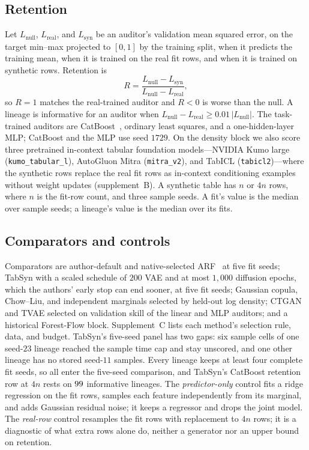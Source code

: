 \documentclass{article} %
\begin{document}
\subsection{Retention}
\label{sec:retention}
Let $L_{\mathrm{null}}$, $L_{\mathrm{real}}$, and $L_{\mathrm{syn}}$ be an auditor's validation mean squared error, on the target min--max projected to $[0,1]$ by the training split, when it predicts the training mean, when it is trained on the real fit rows, and when it is trained on synthetic rows. Retention is
\begin{equation}
\label{eq:retention}
R = \frac{L_{\mathrm{null}}-L_{\mathrm{syn}}}{L_{\mathrm{null}}-L_{\mathrm{real}}} ,
\end{equation}
so $R=1$ matches the real-trained auditor and $R<0$ is worse than the null. A lineage is informative for an auditor when $L_{\mathrm{null}}-L_{\mathrm{real}}\geq 0.01\,|L_{\mathrm{null}}|$. The task-trained auditors are CatBoost~\citep{prokhorenkova2018catboost}, ordinary least squares, and a one-hidden-layer MLP; CatBoost and the MLP use seed $1729$. On the density block we also score three pretrained in-context tabular foundation models---NVIDIA Kumo large (\texttt{kumo\_tabular\_l}), AutoGluon Mitra (\texttt{mitra\_v2}), and TabICL (\texttt{tabicl2})---where the synthetic rows replace the real fit rows as in-context conditioning examples without weight updates (supplement~B). A synthetic table has $n$ or $4n$ rows, where $n$ is the fit-row count, and three sample seeds. A fit's value is the median over sample seeds; a lineage's value is the median over its fits.

\subsection{Comparators and controls}
\label{sec:selection}
Comparators are author-default and native-selected ARF~\citep{watson2023arf} at five fit seeds; TabSyn with a scaled schedule of $200$ VAE and at most $1{,}000$ diffusion epochs, which the authors' early stop can end sooner, at five fit seeds; Gaussian copula, Chow--Liu, and independent marginals selected by held-out log density; CTGAN and TVAE selected on validation skill of the linear and MLP auditors; and a historical Forest-Flow block. Supplement~C lists each method's selection rule, data, and budget. TabSyn's five-seed panel has two gaps: six sample cells of one seed-$23$ lineage reached the sample time cap and stay unscored, and one other lineage has no stored seed-$11$ samples. Every lineage keeps at least four complete fit seeds, so all enter the five-seed comparison, and TabSyn's CatBoost retention row at $4n$ rests on $99$ informative lineages. The \emph{predictor-only} control fits a ridge regression on the fit rows, samples each feature independently from its marginal, and adds Gaussian residual noise; it keeps a regressor and drops the joint model. The \emph{real-row} control resamples the fit rows with replacement to $4n$ rows; it is a diagnostic of what extra rows alone do, neither a generator nor an upper bound on retention.
\end{document}
